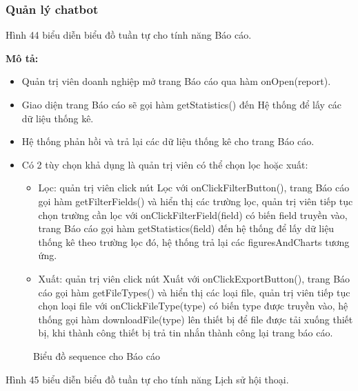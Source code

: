 \subsubsection{Quản lý chatbot}
Hình 44 biểu diễn biểu đồ tuần tự cho tính năng Báo cáo.

\textbf{Mô tả: }
\begin{itemize}
	\item Quản trị viên doanh nghiệp mở trang Báo cáo qua hàm onOpen(report).
	\item Giao diện trang Báo cáo sẽ gọi hàm getStatistics() đến Hệ thống để lấy các dữ liệu thống kê.
	\item Hệ thống phản hồi và trả lại các dữ liệu thống kê cho trang Báo cáo.
	\item Có 2 tùy chọn khả dụng là quản trị viên có thể chọn lọc hoặc xuất:
	\begin{itemize}
		\item Lọc: quản trị viên click nút Lọc với onClickFilterButton(), trang Báo cáo gọi hàm getFilterFields() và hiển thị các trường lọc, quản trị viên tiếp tục chọn trường cần lọc với onClickFilterField(field) có biến field truyền vào, trang Báo cáo gọi hàm getStatistics(field) đến hệ thống để lấy dữ liệu thống kê theo trường lọc đó, hệ thống trả lại các figuresAndCharts tương ứng.
		\item Xuất: quản trị viên click nút Xuất với onClickExportButton(), trang Báo cáo gọi hàm getFileTypes() và hiển thị các loại file, quản trị viên tiếp tục chọn loại file với onClickFileType(type) có biến type được truyền vào, hệ thống gọi hàm downloadFile(type) lên thiết bị để file được tải xuống thiết bị, khi thành công thiết bị trả tin nhắn thành công lại trang báo cáo.
	\end{itemize}
\end{itemize}

\begin{figure}[H]
    \centering
     
    \vspace{0.5cm}
    \caption{Biểu đồ sequence cho Báo cáo}
    \label{fig:enter-label}
\end{figure}

Hình 45 biểu diễn biểu đồ tuần tự cho tính năng Lịch sử hội thoại.

